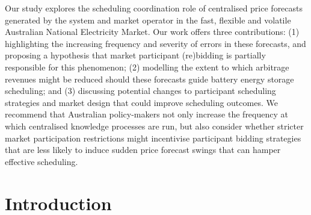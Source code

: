 \documentclass[12pt,a4paper,]{report}
\begin{document}
Our study explores the scheduling coordination role of centralised price
forecasts generated by the system and market operator in the fast,
flexible and volatile Australian National Electricity Market. Our work
offers three contributions: (1) highlighting the increasing frequency
and severity of errors in these forecasts, and proposing a hypothesis
that market participant (re)bidding is partially responsible for this
phenomenon; (2) modelling the extent to which arbitrage revenues might
be reduced should these forecasts guide battery energy storage
scheduling; and (3) discussing potential changes to participant
scheduling strategies and market design that could improve scheduling
outcomes. We recommend that Australian policy-makers not only increase
the frequency at which centralised knowledge processes are run, but also
consider whether stricter market participation restrictions might
incentivise participant bidding strategies that are less likely to
induce sudden price forecast swings that can hamper effective
scheduling.

\hypertarget{sec:info-intro}{%
\section{Introduction}\label{sec:info-intro}}
\end{document}
